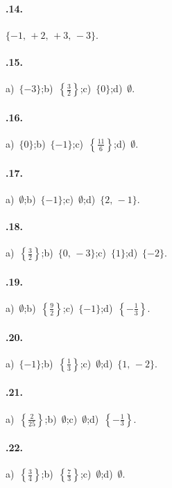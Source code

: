 \begin{multicols}{2}
\paragraph{\thechapter.14.}
$\{-1\text{,~}+2\text{,~}+3\text{,~}-3\}$.

\paragraph{\thechapter.15.}
a)~$\{-3\}$;\quad b)~$\left\{\frac{3}{2}\right\}$;\quad c)~$\{0\}$;\quad d)~$\emptyset$.

\paragraph{\thechapter.16.}
a)~$\{0\}$;\quad b)~$\{-1\}$;\quad c)~$\left\{\frac{11}{6}\right\}$;\quad d)~$\emptyset$.

\paragraph{\thechapter.17.}
a)~$\emptyset$;\quad b)~$\{-1\}$;\quad c)~$\emptyset$;\quad d)~$\{2\text{,~}-1\}$.

\paragraph{\thechapter.18.}
a)~$\left\{\frac{3}{2}\right\}$;\quad b)~$\{0\text{,~}-3\}$;\quad c)~$\{1\}$;\quad d)~$\{-2\}$.

\paragraph{\thechapter.19.}
a)~$\emptyset$;\quad b)~$\left\{\frac{9}{2}\right\}$;\quad c)~$\{-1\}$;\quad d)~$\left\{-{\frac{1}{3}}\right\}$.

\paragraph{\thechapter.20.}
a)~$\{-1\}$;\quad b)~$\left\{\frac{1}{3}\right\}$;\quad c)~$\emptyset$;\quad d)~$\{1\text{,~}-2\}$.

\paragraph{\thechapter.21.}
a)~$\left\{\frac{2}{25}\right\}$;\quad b)~$\emptyset$;\quad c)~$\emptyset$;\quad d)~$\left\{-{\frac{1}{3}}\right\}$.

\paragraph{\thechapter.22.}
a)~$\left\{\frac{3}{4}\right\}$;\quad b)~$\left\{\frac{7}{3}\right\}$;\quad c)~$\emptyset$;\quad d)~$\emptyset$.


\end{multicols}
